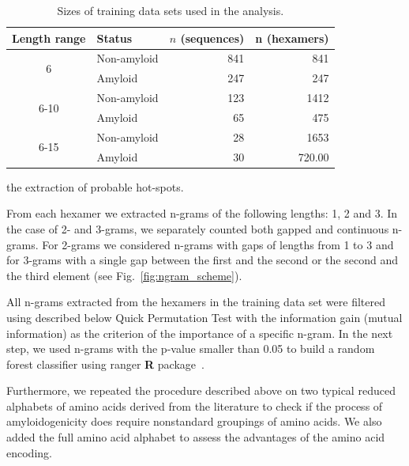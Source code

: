 \documentclass[a4,center,fleqn]{NAR}
\begin{document}
\begin{table}[]
\centering
\caption{Sizes of training data sets used in the analysis.}
\label{tab:training_sets}
\begin{tabular}{clrr}
\hline
Length range & Status & $n$ (sequences) & n (hexamers) \\ \hline
\multirow{2}{*}{6} & Non-amyloid & 841 & 841 \\
 & Amyloid & 247 & 247 \\
\hline
\multirow{2}{*}{6-10} & Non-amyloid & 123 & 1412 \\
 & Amyloid & 65 & 475 \\
\hline
\multirow{2}{*}{6-15} & Non-amyloid & 28 & 1653 \\
 & Amyloid & 30 & 720.00 \\
\hline
\end{tabular}
\end{table}

%
%
%
the extraction of probable hot-spots.

  From each hexamer we extracted n-grams of the following lengths: 1, 2 and 3. In 
the case of 2- and 3-grams, we separately counted both gapped and continuous 
n-grams. For 2-grams we considered n-grams with gaps of lengths from 1 to 3 and for 
%
%
%
3-grams with a single gap between the first and the second or the second and the 
third element (see Fig.~\ref{fig:ngram_scheme}).

  All n-grams extracted from the hexamers in the training data set were filtered 
using described below Quick Permutation Test with the information gain (mutual 
information) as the criterion of the importance of a specific n-gram. In the 
next step, we used n-grams with the p-value smaller than 0.05 to build a random 
forest classifier using ranger \textbf{R} package~\citep{wright_ranger:_2015}. 

  Furthermore, we repeated the procedure described above on two typical reduced 
alphabets of amino acids derived from the literature to check if the process of 
%
%
%
%
%
amyloidogenicity does require nonstandard groupings of amino acids. We also 
added the full amino acid alphabet to assess the advantages of the amino acid 
encoding.
\end{document}
